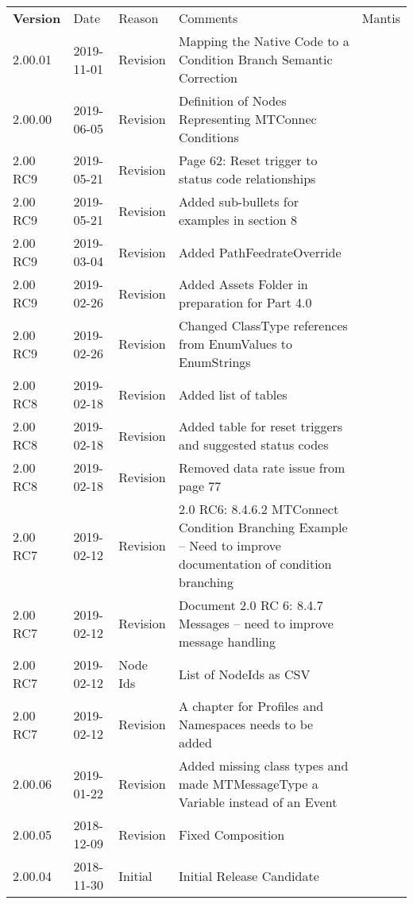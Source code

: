 \documentclass{mtc-opc}	%
\begin{document}
\begin{nolinenumbers}
\begin{table}[ht]
    \centering
    \fontsize{9pt}{11pt}\selectfont
    \tabulinesep=3pt
    \begin{tabu} to 6in {|X[-1]|X[-1.25]|X[-0.75]|X[5.25]|X[-0.75]|} \everyrow{\hline}
        \hline
        \rowfont \bfseries Version & Date & Reason & Comments & Mantis \\        
        2.00.01 & 2019-11-01 & Revision & Mapping the Native Code to a Condition Branch Semantic Correction &  \\
        2.00.00 & 2019-06-05 & Revision & Definition of Nodes Representing MTConnec Conditions &  \\
        2.00 RC9 & 2019-05-21 & Revision & Page 62: Reset trigger to status code relationships &  \\
        2.00 RC9 & 2019-05-21 & Revision & Added sub-bullets for examples in section 8 &  \\
        2.00 RC9 & 2019-03-04 & Revision & Added PathFeedrateOverride &  \\
        2.00 RC9 & 2019-02-26 & Revision & Added Assets Folder in preparation for Part 4.0 &  \\
        2.00 RC9 & 2019-02-26 & Revision & Changed ClassType references from EnumValues to EnumStrings &  \\
        2.00 RC8 & 2019-02-18 & Revision & Added list of tables &  \\
        2.00 RC8 & 2019-02-18 & Revision & Added table for reset triggers and suggested status codes &  \\
        2.00 RC8 & 2019-02-18 & Revision & Removed data rate issue from page 77 &  \\
        2.00 RC7 & 2019-02-12 & Revision & 2.0 RC6: 8.4.6.2 MTConnect Condition Branching Example -- Need to improve documentation of condition branching &  \\        
        2.00 RC7 & 2019-02-12 & Revision & Document 2.0 RC 6: 8.4.7 Messages -- need to improve message handling &  \\
        2.00 RC7 & 2019-02-12 & Node Ids & List of NodeIds as CSV &  \\
        2.00 RC7 & 2019-02-12 & Revision & A chapter for Profiles and Namespaces needs to be added &   \\
        2.00.06 & 2019-01-22 & Revision & Added missing class types and made MTMessageType a Variable instead of an Event &\\
        2.00.05 & 2018-12-09 & Revision & Fixed Composition & \\
        2.00.04 & 2018-11-30 & Initial & Initial Release Candidate & \\ 
    \end{tabu}
\end{table}


\end{nolinenumbers}
\end{document}

